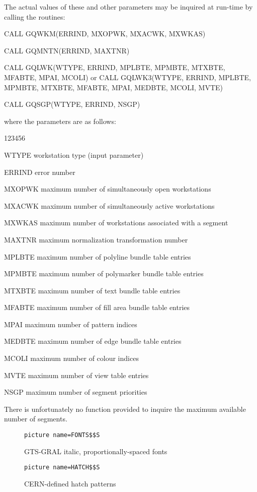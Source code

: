 The actual values of these and other parameters
may be inquired at run-time by calling the routines:
\begin{XMP}
CALL GQWKM(ERRIND, MXOPWK, MXACWK, MXWKAS)
 
CALL GQMNTN(ERRIND, MAXTNR)
 
CALL GQLWK(WTYPE, ERRIND, MPLBTE, MPMBTE, MTXBTE, MFABTE, MPAI, MCOLI)
    or
CALL GQLWK3(WTYPE, ERRIND, MPLBTE, MPMBTE, MTXBTE, MFABTE, MPAI,
             MEDBTE, MCOLI, MVTE)
 
CALL GQSGP(WTYPE, ERRIND, NSGP)
\end{XMP}
where the parameters are as follows:
\begin{DLtt}{123456}
\item[WTYPE]workstation type (input parameter)
\item[ERRIND]error number
\item[MXOPWK]maximum number of simultaneously open workstations
\item[MXACWK]maximum number of simultaneously active workstations
\item[MXWKAS]maximum number of workstations associated with a segment
\item[MAXTNR]maximum normalization transformation number
\item[MPLBTE]maximum number of polyline bundle table entries
\item[MPMBTE]maximum number of polymarker bundle table entries
\item[MTXBTE]maximum number of text bundle table entries
\item[MFABTE]maximum number of fill area bundle table entries
\item[MPAI]maximum number of pattern indices
\item[MEDBTE]maximum number of edge bundle table entries
\item[MCOLI]maximum number of colour indices
\item[MVTE]maximum number of view table entries
\item[NSGP]maximum number of segment priorities
\end{DLtt}
There is unfortunately no function provided to inquire the maximum available
number of segments.
\begin{figure}[h]
\begin{verbatim}
picture name=FONTS$$S
\end{verbatim}
\caption{GTS-GRAL italic, proportionally-spaced fonts}
\label{fig:fonts}
\end{figure}
\begin{figure}[h]
\begin{verbatim}
picture name=HATCH$$S
\end{verbatim}
\caption{CERN-defined hatch patterns}
\label{fig:hatch}
\end{figure}
